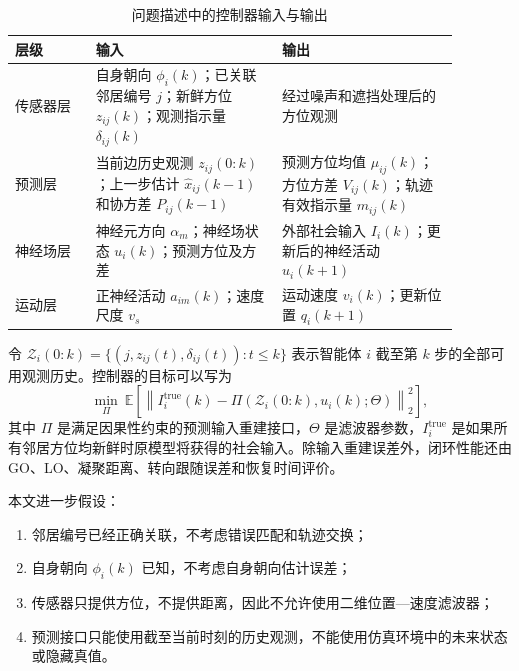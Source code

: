 \documentclass[UTF8,fontset=windows,11pt]{ctexart}
\begin{document}
\begin{table}[htbp]
 \centering
 \small
 \caption{问题描述中的控制器输入与输出}
 \label{tab:problem_io}
 \begin{tabular}{>{\raggedright\arraybackslash}p{0.16\linewidth}
                 >{\raggedright\arraybackslash}p{0.37\linewidth}
                 >{\raggedright\arraybackslash}p{0.35\linewidth}}
 \toprule
 层级 & 输入 & 输出\\
 \midrule
 传感器层 &
 自身朝向 $\phi_i(k)$；已关联邻居编号 $j$；新鲜方位 $z_{ij}(k)$；观测指示量 $\delta_{ij}(k)$ &
 经过噪声和遮挡处理后的方位观测\\
 预测层 &
 当前边历史观测 $z_{ij}(0:k)$；上一步估计 $\hat x_{ij}(k-1)$ 和协方差 $P_{ij}(k-1)$ &
 预测方位均值 $\mu_{ij}(k)$；方位方差 $V_{ij}(k)$；轨迹有效指示量 $m_{ij}(k)$\\
 神经场层 &
 神经元方向 $\alpha_m$；神经场状态 $u_i(k)$；预测方位及方差 &
 外部社会输入 $I_i(k)$；更新后的神经活动 $u_i(k+1)$\\
 运动层 &
 正神经活动 $a_{im}(k)$；速度尺度 $v_s$ &
 运动速度 $v_i(k)$；更新位置 $q_i(k+1)$\\
 \bottomrule
 \end{tabular}
\end{table}

令 $\mathcal Z_i(0:k)=\{(j,z_{ij}(t),\delta_{ij}(t)):t\le k\}$ 表示智能体 $i$ 截至第 $k$ 步的全部可用观测历史。控制器的目标可以写为
\begin{equation}
 \min_{\Pi}\ \mathbb E\left[
 \left\|I_i^{\mathrm{true}}(k)-\Pi(\mathcal Z_i(0:k),u_i(k);\Theta)\right\|_2^2
 \right],
\end{equation}
其中 $\Pi$ 是满足因果性约束的预测输入重建接口，$\Theta$ 是滤波器参数，$I_i^{\mathrm{true}}$ 是如果所有邻居方位均新鲜时原模型将获得的社会输入。除输入重建误差外，闭环性能还由 GO、LO、凝聚距离、转向跟随误差和恢复时间评价。

本文进一步假设：

\begin{enumerate}[label=(\arabic*)]
 \item 邻居编号已经正确关联，不考虑错误匹配和轨迹交换；
 \item 自身朝向 $\phi_i(k)$ 已知，不考虑自身朝向估计误差；
 \item 传感器只提供方位，不提供距离，因此不允许使用二维位置—速度滤波器；
 \item 预测接口只能使用截至当前时刻的历史观测，不能使用仿真环境中的未来状态或隐藏真值。
\end{enumerate}
\end{document}
